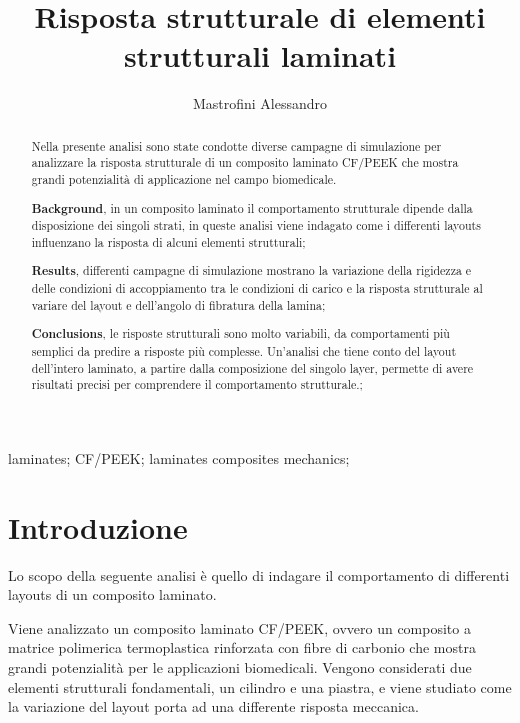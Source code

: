 \documentclass[a4paper,num-refs]{oup-contemporary}
\title{Risposta strutturale di elementi strutturali laminati}
\author{Mastrofini Alessandro}
\begin{document}
\begin{frontmatter}
\maketitle
\begin{abstract}

Nella presente analisi sono state condotte diverse campagne di simulazione per analizzare la risposta strutturale di un composito laminato CF/PEEK che mostra grandi potenzialità di applicazione nel campo biomedicale. 

 \textbf{Background}, in un composito laminato il comportamento strutturale dipende dalla disposizione dei singoli strati, in queste analisi viene indagato come i differenti layouts influenzano la risposta di alcuni elementi strutturali;
 
  \textbf{Results}, differenti campagne di simulazione mostrano la variazione della rigidezza e delle condizioni di accoppiamento tra le condizioni di carico e la risposta strutturale al variare del layout e dell'angolo di fibratura della lamina;
  
   \textbf{Conclusions}, le risposte strutturali sono molto variabili, da comportamenti più semplici da predire a risposte più complesse. Un'analisi che tiene conto del layout dell'intero laminato, a partire dalla composizione del singolo layer, permette di avere risultati precisi per comprendere il comportamento strutturale.;
   

\end{abstract}

\begin{keywords}
laminates; CF/PEEK; laminates composites mechanics; 
\end{keywords}
\end{frontmatter}



\section{Introduzione}

Lo scopo della seguente analisi è quello di indagare il comportamento di differenti layouts di un composito laminato.

Viene analizzato un composito laminato CF/PEEK, ovvero un composito a matrice polimerica termoplastica rinforzata con fibre di carbonio che mostra grandi potenzialità per le applicazioni biomedicali. Vengono considerati due elementi strutturali fondamentali, un cilindro e una piastra, e viene studiato come la variazione del layout porta ad una differente risposta meccanica.  
\end{document}
